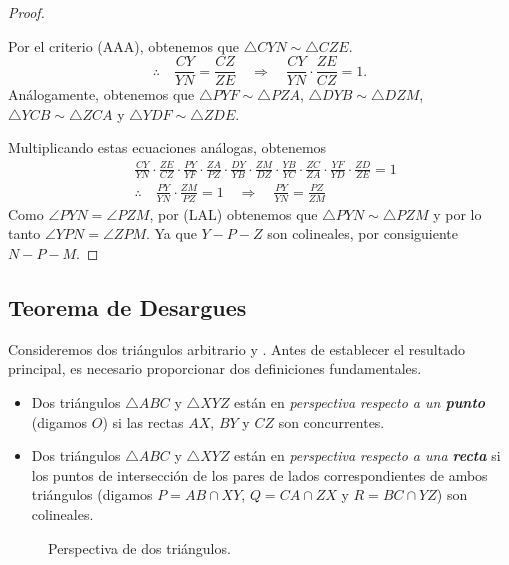 \begin{proof}
\begin{multicols}{2}
    Por el criterio (AAA), obtenemos que $\triangle CYN \sim \triangle CZE$.
    \[
        \therefore  \quad \frac{CY}{YN} = \frac{CZ}{ZE} \quad \Rightarrow \quad \frac{CY}{YN} \cdot \frac{ZE}{CZ} = 1.
    \]
    Análogamente, obtenemos que $\triangle PYF \sim \triangle PZA$, $\triangle DYB \sim \triangle DZM$, $\triangle YCB \sim \triangle ZCA$ y $\triangle YDF \sim \triangle ZDE$.
    \end{multicols}

    Multiplicando estas ecuaciones análogas, obtenemos
    \begin{align*}
        &\frac{CY}{YN} \cdot \frac{ZE}{CZ} \cdot \frac{PY}{YF} \cdot \frac{ZA}{PZ} \cdot \frac{DY}{YB} \cdot \frac{ZM}{DZ} \cdot \frac{YB}{YC} \cdot \frac{ZC}{ZA} \cdot \frac{YF}{YD} \cdot \frac{ZD}{ZE} = 1\\[3mm]
        &\therefore \quad \frac{PY}{YN} \cdot \frac{ZM}{PZ} = 1 \quad \Rightarrow \quad \frac{PY}{YN} = \frac{PZ}{ZM}
    \end{align*}
    Como $\angle PYN = \angle PZM$, por (LAL) obtenemos que $\triangle PYN \sim \triangle PZM$ y por lo tanto $\angle YPN = \angle ZPM$.
    Ya que $Y - P - Z$ son colineales, por consiguiente $N - P - M$.
\end{proof}




\subsection{Teorema de Desargues}
Consideremos dos triángulos arbitrario  y .
Antes de establecer el resultado principal, es necesario proporcionar dos definiciones fundamentales.
\begin{section-definition.tcb}
    \begin{itemize}
        \item Dos triángulos $\triangle ABC$ y $\triangle XYZ$ están en \textit{perspectiva respecto a un \textbf{punto}} (digamos $O$) si las rectas $AX$, $BY$ y $CZ$ son concurrentes.
        \item Dos triángulos $\triangle ABC$ y $\triangle XYZ$ están en \textit{perspectiva respecto a una \textbf{recta}} si los puntos de intersección de los pares de lados correspondientes de ambos triángulos (digamos $P = AB \cap XY$, $Q = CA \cap ZX$ y $R = BC \cap YZ$) son colineales.
    \end{itemize}
\end{section-definition.tcb}
\begin{figure}[H]
    \centering
    
    \caption{Perspectiva de dos triángulos.}
\end{figure}

